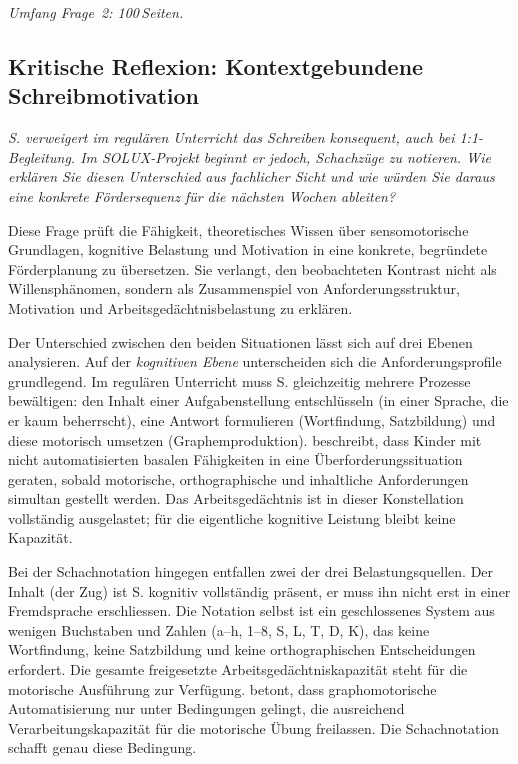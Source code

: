 \documentclass[ngerman, a4paper]{article}
\begin{document}
\textit{Umfang Frage~2: 100\,Seiten.}
 

 

\subsection{Kritische Reflexion: Kontextgebundene Schreibmotivation}


\begin{tcolorbox}[colback=gray!5, colframe=gray!50, title=Weiterführende Diskurslinie]
\itshape
S. verweigert im regulären Unterricht das Schreiben konsequent, auch bei
1:1-Begleitung. Im SOLUX-Projekt beginnt er jedoch, Schachzüge zu notieren.
Wie erklären Sie diesen Unterschied aus fachlicher Sicht und wie würden Sie
daraus eine konkrete Fördersequenz für die nächsten Wochen ableiten?
\end{tcolorbox}

Diese Frage prüft die Fähigkeit, theoretisches Wissen über sensomotorische
Grundlagen, kognitive Belastung und Motivation in eine konkrete, begründete
Förderplanung zu übersetzen. Sie verlangt, den beobachteten Kontrast nicht als
Willensphänomen, sondern als Zusammenspiel von Anforderungsstruktur, Motivation
und Arbeitsgedächtnisbelastung zu erklären.

Der Unterschied zwischen den beiden Situationen lässt sich auf drei Ebenen
analysieren. Auf der \textit{kognitiven Ebene} unterscheiden sich die
Anforderungsprofile grundlegend. Im regulären Unterricht muss S. gleichzeitig
mehrere Prozesse bewältigen: den Inhalt einer Aufgabenstellung entschlüsseln
(in einer Sprache, die er kaum beherrscht), eine Antwort formulieren
(Wortfindung, Satzbildung) und diese motorisch umsetzen (Graphemproduktion).
\textcite[Kap.\,1--4]{gold2018lesenkannmanlernen} beschreibt, dass Kinder mit nicht automatisierten basalen Fähigkeiten in
eine Überforderungssituation geraten, sobald motorische, orthographische und
inhaltliche Anforderungen simultan gestellt werden. Das Arbeitsgedächtnis ist
in dieser Konstellation vollständig ausgelastet; für die eigentliche kognitive
Leistung bleibt keine Kapazität.

Bei der Schachnotation hingegen entfallen zwei der drei Belastungsquellen. Der
Inhalt (der Zug) ist S. kognitiv vollständig präsent, er muss ihn nicht erst
in einer Fremdsprache erschliessen. Die Notation selbst ist ein geschlossenes
System aus wenigen Buchstaben und Zahlen (a--h, 1--8, S, L, T, D, K), das keine
Wortfindung, keine Satzbildung und keine orthographischen Entscheidungen
erfordert. Die gesamte freigesetzte Arbeitsgedächtniskapazität steht für die
motorische Ausführung zur Verfügung. \textcite[S.\,2--4]{sturm2016graphomotorik} betont, dass graphomotorische
Automatisierung nur unter Bedingungen gelingt, die ausreichend
Verarbeitungskapazität für die motorische Übung freilassen. Die Schachnotation
schafft genau diese Bedingung.
\end{document}
